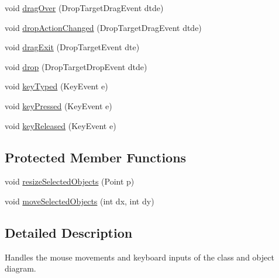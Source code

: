 \begin{DoxyCompactItemize}
\item 
void \hyperlink{classorg_1_1tzi_1_1use_1_1gui_1_1views_1_1diagrams_1_1event_1_1_diagram_input_handling_a18d9863c998afd2b9bea279c62fa218c}{drag\-Over} (Drop\-Target\-Drag\-Event dtde)
\item 
void \hyperlink{classorg_1_1tzi_1_1use_1_1gui_1_1views_1_1diagrams_1_1event_1_1_diagram_input_handling_a62a0e5d6f19a20f048a7313b85c07156}{drop\-Action\-Changed} (Drop\-Target\-Drag\-Event dtde)
\item 
void \hyperlink{classorg_1_1tzi_1_1use_1_1gui_1_1views_1_1diagrams_1_1event_1_1_diagram_input_handling_ac62e964516620b23ded5016f208a2e90}{drag\-Exit} (Drop\-Target\-Event dte)
\item 
void \hyperlink{classorg_1_1tzi_1_1use_1_1gui_1_1views_1_1diagrams_1_1event_1_1_diagram_input_handling_a22c3db4105e9971fc71aa2822dec7837}{drop} (Drop\-Target\-Drop\-Event dtde)
\item 
void \hyperlink{classorg_1_1tzi_1_1use_1_1gui_1_1views_1_1diagrams_1_1event_1_1_diagram_input_handling_ae0c77bf4535c99d69cc0b24ecca944d9}{key\-Typed} (Key\-Event e)
\item 
void \hyperlink{classorg_1_1tzi_1_1use_1_1gui_1_1views_1_1diagrams_1_1event_1_1_diagram_input_handling_ae5b2d2763a29accfcc239d107e0bd188}{key\-Pressed} (Key\-Event e)
\item 
void \hyperlink{classorg_1_1tzi_1_1use_1_1gui_1_1views_1_1diagrams_1_1event_1_1_diagram_input_handling_a27bbd6c47addc88996e995911cc9706e}{key\-Released} (Key\-Event e)
\end{DoxyCompactItemize}
\subsection*{Protected Member Functions}
\begin{DoxyCompactItemize}
\item 
void \hyperlink{classorg_1_1tzi_1_1use_1_1gui_1_1views_1_1diagrams_1_1event_1_1_diagram_input_handling_a0eabf830275f62fb765fc442012952bd}{resize\-Selected\-Objects} (Point p)
\item 
void \hyperlink{classorg_1_1tzi_1_1use_1_1gui_1_1views_1_1diagrams_1_1event_1_1_diagram_input_handling_ae1bd36974e195de8169ad1dad5fae8d8}{move\-Selected\-Objects} (int dx, int dy)
\end{DoxyCompactItemize}


\subsection{Detailed Description}
Handles the mouse movements and keyboard inputs of the class and object diagram.

